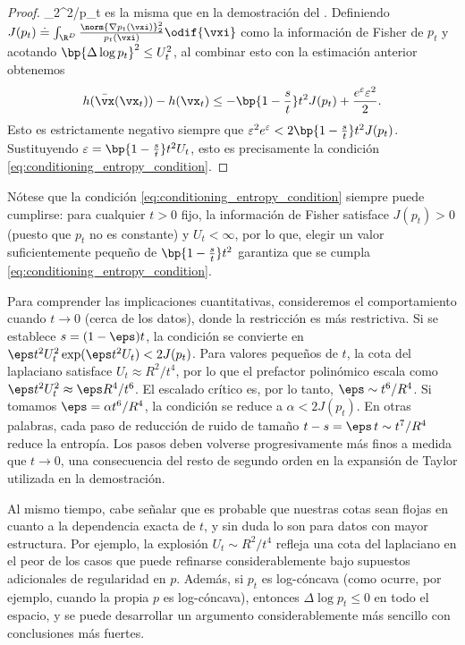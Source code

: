 \documentclass[../../book-main_es.tex]{subfiles}
\begin{document}
\begin{proof}
    _{2}^{2}/p_{t}\) es la misma que en la demostración
    del . Definiendo \(J(p_{t})
    \doteq \int_{\R^{D}}\frac{\norm{\nabla
    p_{t}(\vxi)}_{2}^{2}}{p_{t}(\vxi)}\odif{\vxi}\) como la información de Fisher
    de \(p_{t}\) y acotando \(\bp{\Delta \log
    p_{t}}^{2} \leq U_{t}^{2}\), al combinar esto con la estimación anterior obtenemos
    \begin{equation}
        h(\bar{\vx}(\vx_{t})) - h(\vx_{t}) \leq -\bp{1 -
        \frac{s}{t}}t^{2}J(p_{t}) +
        \frac{e^{\varepsilon}\varepsilon^{2}}{2}.
    \end{equation}
    Esto es estrictamente negativo siempre que
    \(\varepsilon^{2}e^{\varepsilon} < 2\bp{1 -
    \frac{s}{t}}t^{2}J(p_{t})\). Sustituyendo
    \(\varepsilon = \bp{1 - \frac{s}{t}}t^{2}U_{t}\), esto es
    precisamente la condición
    \eqref{eq:conditioning_entropy_condition}.
\end{proof}

Nótese que la condición \eqref{eq:conditioning_entropy_condition}
siempre puede cumplirse: para cualquier \(t > 0\) fijo, la información de Fisher
satisface \(J(p_{t}) > 0\) (puesto que \(p_{t}\) no es
constante) y \(U_{t} < \infty\), por lo que, elegir un valor suficientemente pequeño de \(\bp{1 -
\frac{s}{t}}t^{2}\) garantiza que
se cumpla \eqref{eq:conditioning_entropy_condition}.

Para comprender las implicaciones cuantitativas, consideremos el
comportamiento cuando \(t \to 0\) (cerca de los datos), donde la restricción es
más restrictiva. Si se establece \(s = (1 - \eps)t\), la condición
se convierte en \(\eps t^{2}U_{t}^{2}\exp(\eps t^{2}U_{t}) <
2J(p_{t})\). Para valores pequeños de \(t\), la cota del laplaciano satisface
\(U_{t} \approx R^{2}/t^{4}\), por lo que el prefactor polinómico escala como
\(\eps t^{2}U_{t}^{2} \approx \eps R^{4}/t^{6}\). El
escalado crítico es, por lo tanto,
\(\eps \sim t^{6}/R^{4}\). Si tomamos
\(\eps = \alpha t^{6}/R^{4}\),
la condición se reduce a \(\alpha < 2J(p_{t})\). En otras
palabras, cada paso de reducción de ruido de tamaño
\(t - s = \eps\, t \sim t^{7}/R^{4}\) reduce la entropía.
Los pasos deben volverse progresivamente más finos a medida que \(t \to 0\), una
consecuencia del resto de segundo orden en la expansión de Taylor
utilizada en la demostración.

Al mismo tiempo, cabe señalar que es probable que nuestras cotas sean flojas en
cuanto a la dependencia exacta de \(t\), y sin duda lo son para datos
con mayor estructura. Por ejemplo, la explosión
\(U_{t} \sim R^{2}/t^{4}\) refleja una cota del laplaciano en el peor de los casos
que puede refinarse considerablemente bajo
supuestos adicionales de regularidad en \(p\). Además, si
\(p_{t}\) es log-cóncava (como ocurre, por ejemplo, cuando la propia \(p\) es
log-cóncava), entonces \(\Delta \log p_{t} \leq 0\) en todo el espacio, y se puede desarrollar un argumento considerablemente
más sencillo con conclusiones más fuertes.
\end{document}
